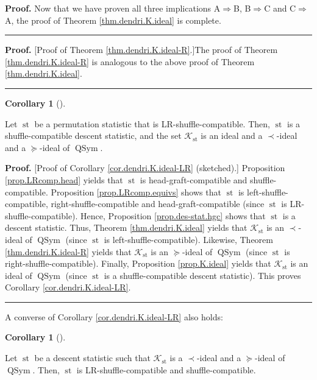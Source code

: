 \documentclass[numbers=enddot,12pt,final,onecolumn,notitlepage]{scrartcl}%
\theoremstyle{definition}
\newtheorem{coro}[theo]{Corollary}
\newenvironment{corollary}[1][]
{\begin{coro}[#1]\begin{leftbar}}
{\end{leftbar}\end{coro}}
\newenvironment{proof}[1][Proof]{\noindent\textbf{#1.} }{\ \rule{0.5em}{0.5em}}
\newenvironment{verlong}{}{}
\begin{document}
\begin{verlong}
\begin{proof}
Now that we have proven all three implications A$\Longrightarrow$B,
B$\Longrightarrow$C and C$\Longrightarrow$A, the proof of Theorem
\ref{thm.dendri.K.ideal} is complete.
\end{proof}

\begin{proof}
[Proof of Theorem \ref{thm.dendri.K.ideal-R}.]The proof of Theorem
\ref{thm.dendri.K.ideal-R} is analogous to the above proof of Theorem
\ref{thm.dendri.K.ideal}.
\end{proof}

\begin{corollary}
\label{cor.dendri.K.ideal-LR}Let $\operatorname*{st}$ be a permutation
statistic that is LR-shuffle-compatible. Then, $\operatorname*{st}$ is a
shuffle-compatible descent statistic, and the set $\mathcal{K}%
_{\operatorname*{st}}$ is an ideal and a $\left.  \prec\right.  $-ideal and a
$\left.  \succeq\right.  $-ideal of $\operatorname*{QSym}$.
\end{corollary}

\begin{proof}
[Proof of Corollary \ref{cor.dendri.K.ideal-LR} (sketched).] Proposition
\ref{prop.LRcomp.head} yields that $\operatorname*{st}$ is
head-graft-compatible and shuffle-compatible. Proposition
\ref{prop.LRcomp.equivs} shows that $\operatorname*{st}$ is
left-shuffle-compatible, right-shuffle-compatible and head-graft-compatible
(since $\operatorname*{st}$ is LR-shuffle-compatible). Hence, Proposition
\ref{prop.des-stat.hgc} shows that $\operatorname*{st}$ is a descent
statistic. Thus, Theorem \ref{thm.dendri.K.ideal} yields that $\mathcal{K}%
_{\operatorname*{st}}$ is an $\left.  \prec\right.  $-ideal of
$\operatorname*{QSym}$ (since $\operatorname*{st}$ is
left-shuffle-compatible). Likewise, Theorem \ref{thm.dendri.K.ideal-R} yields
that $\mathcal{K}_{\operatorname*{st}}$ is an $\left.  \succeq\right.  $-ideal
of $\operatorname*{QSym}$ (since $\operatorname*{st}$ is
right-shuffle-compatible). Finally, Proposition \ref{prop.K.ideal} yields that
$\mathcal{K}_{\operatorname*{st}}$ is an ideal of $\operatorname*{QSym}$
(since $\operatorname*{st}$ is a shuffle-compatible descent statistic). This
proves Corollary \ref{cor.dendri.K.ideal-LR}.
\end{proof}

A converse of Corollary \ref{cor.dendri.K.ideal-LR} also holds:

\begin{corollary}
\label{cor.dendri.K.ideal-LRi}Let $\operatorname*{st}$ be a descent statistic
such that $\mathcal{K}_{\operatorname*{st}}$ is a $\left.  \prec\right.
$-ideal and a $\left.  \succeq\right.  $-ideal of $\operatorname*{QSym}$.
Then, $\operatorname*{st}$ is LR-shuffle-compatible and shuffle-compatible.
\end{corollary}


\end{verlong}
\end{document}
